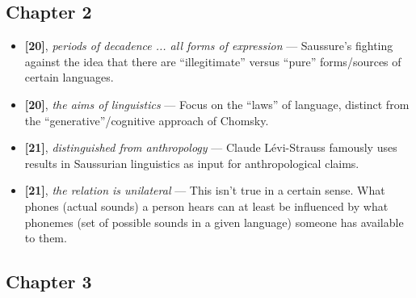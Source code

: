 \documentclass[12pt]{article}
\begin{document}
\subsection{Chapter 2}

\begin{itemize}

\item \textbf{[20]}, \textit{periods of decadence ... all forms of expression} --- Saussure's fighting against the idea that there are ``illegitimate'' versus ``pure'' forms/sources of certain languages.

\item \textbf{[20]}, \textit{the aims of linguistics} --- Focus on the ``laws'' of language, distinct from the ``generative''/cognitive approach of Chomsky.

\item \textbf{[21]}, \textit{distinguished from anthropology} --- Claude L\'{e}vi-Strauss famously uses results in Saussurian linguistics as input for anthropological claims.

\item \textbf{[21]}, \textit{the relation is unilateral} --- This isn't true in a certain sense. What phones (actual sounds) a person hears can at least be influenced by what phonemes (set of possible sounds in a given language) someone has available to them.

\end{itemize}

\subsection{Chapter 3}
\end{document}
